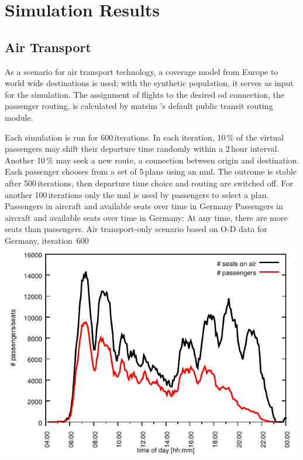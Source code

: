 %

\section{Simulation Results}
\label{sec:air_rail_results}
\subsection{Air Transport}
As a scenario for air transport technology, a coverage model from Europe to world wide destinations is used; 
with the synthetic population, it serves as input for the simulation.
The assignment of flights to the desired \gls{od} connection, \ie the passenger routing, is calculated by \gls{matsim} 's default public transit routing module.

Each simulation is run for 600\,iterations.
In each iteration, 10\,\% of the virtual passengers may shift their departure time randomly within a 2\,hour interval.
Another 10\,\% may seek a new route, \ie a connection between origin and destination. 
Each passenger chooses from a set of 5\,plans using an \gls{mnl}.
The outcome is stable after 500\,iterations, then departure time choice and routing are switched off. 
For another 100\,iterations only the \gls{mnl} is used by  passengers to select a plan. 
%
\createfigure%
{Passengers in aircraft and available seats over time in Germany}%
{Passengers in aircraft and available seats over time in Germany: At any time, there are more seats than passengers. Air transport-only scenario based on O-D data for Germany, iteration~600}%
{\label{fig:2009_passengers_seats}}%
{\includegraphics[width=0.99\textwidth, angle=0]{./scenarios/figures/in_vehicle_histogram_flight_1876_it_600.pdf}}%
{}

